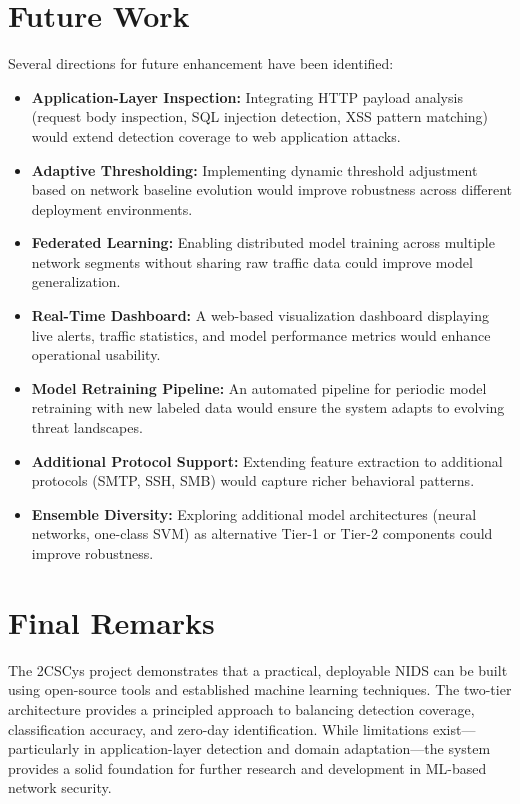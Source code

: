 \documentclass[12pt,a4paper,twoside]{report}
\begin{document}
\section{Future Work}

Several directions for future enhancement have been identified:

\begin{itemize}
    \item \textbf{Application-Layer Inspection:} Integrating HTTP payload analysis (request body inspection, SQL injection detection, XSS pattern matching) would extend detection coverage to web application attacks.
    \item \textbf{Adaptive Thresholding:} Implementing dynamic threshold adjustment based on network baseline evolution would improve robustness across different deployment environments.
    \item \textbf{Federated Learning:} Enabling distributed model training across multiple network segments without sharing raw traffic data could improve model generalization.
    \item \textbf{Real-Time Dashboard:} A web-based visualization dashboard displaying live alerts, traffic statistics, and model performance metrics would enhance operational usability.
    \item \textbf{Model Retraining Pipeline:} An automated pipeline for periodic model retraining with new labeled data would ensure the system adapts to evolving threat landscapes.
    \item \textbf{Additional Protocol Support:} Extending feature extraction to additional protocols (SMTP, SSH, SMB) would capture richer behavioral patterns.
    \item \textbf{Ensemble Diversity:} Exploring additional model architectures (neural networks, one-class SVM) as alternative Tier-1 or Tier-2 components could improve robustness.
\end{itemize}

\section{Final Remarks}

The 2CSCys project demonstrates that a practical, deployable NIDS can be built using open-source tools and established machine learning techniques. The two-tier architecture provides a principled approach to balancing detection coverage, classification accuracy, and zero-day identification. While limitations exist—particularly in application-layer detection and domain adaptation—the system provides a solid foundation for further research and development in ML-based network security.
\end{document}
